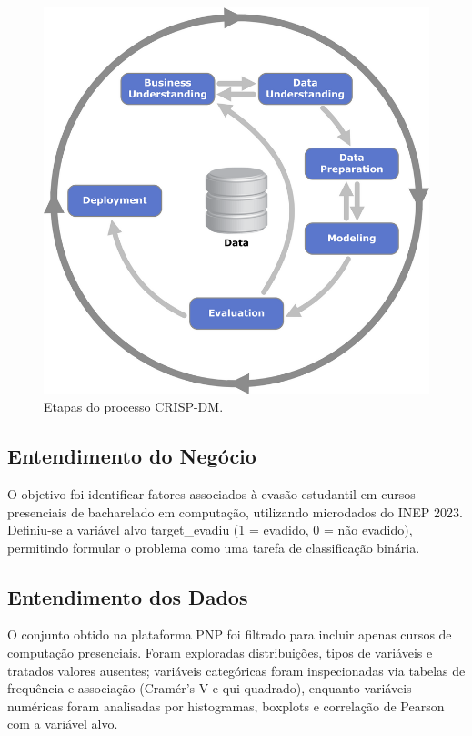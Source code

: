 \documentclass[english, spanish, brazilian]{RBIEarticle} %
\begin{document}
\begin{figure}[h]
    \centerline{\includegraphics[scale=2.6]{images/CRISP-DM_Process_Diagram.png}}
    \caption{Etapas do processo CRISP-DM. \cite{crispdm}}
    \label{fig:one}
\end{figure}

\subsection{Entendimento do Negócio}
O objetivo foi identificar fatores associados à evasão estudantil em cursos presenciais de bacharelado em computação, utilizando microdados do INEP 2023. Definiu-se a variável alvo \mbox{target\_evadiu} (1 = evadido, 0 = não evadido), permitindo formular o problema como uma tarefa de classificação binária.

\subsection{Entendimento dos Dados}
O conjunto obtido na plataforma PNP foi filtrado para incluir apenas cursos de computação presenciais. Foram exploradas distribuições, tipos de variáveis e tratados valores ausentes; variáveis categóricas foram inspecionadas via tabelas de frequência e associação (Cramér’s V e qui-quadrado), enquanto variáveis numéricas foram analisadas por histogramas, boxplots e correlação de Pearson com a variável alvo.
\end{document}
